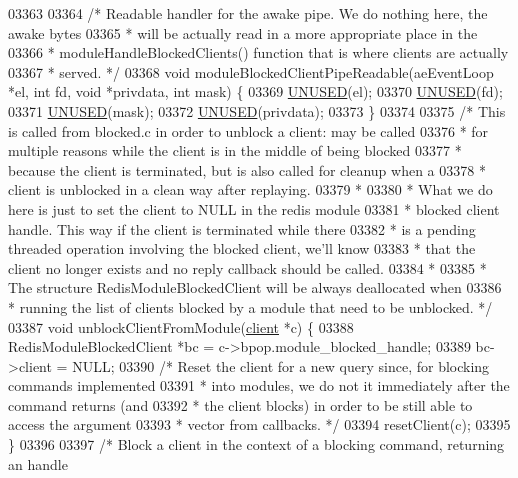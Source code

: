 \begin{DoxyCode}
{{{{{{{{{{03363 
03364 \textcolor{comment}{/* Readable handler for the awake pipe. We do nothing here, the awake bytes}
03365 \textcolor{comment}{ * will be actually read in a more appropriate place in the}
03366 \textcolor{comment}{ * moduleHandleBlockedClients() function that is where clients are actually}
03367 \textcolor{comment}{ * served. */}
03368 \textcolor{keywordtype}{void} moduleBlockedClientPipeReadable(aeEventLoop *el, \textcolor{keywordtype}{int} fd, \textcolor{keywordtype}{void} *privdata, \textcolor{keywordtype}{int} mask) \{
03369     \hyperlink{server_8h_ae7c9dc8f13568a9c856573751f1ee1ec}{UNUSED}(el);
03370     \hyperlink{server_8h_ae7c9dc8f13568a9c856573751f1ee1ec}{UNUSED}(fd);
03371     \hyperlink{server_8h_ae7c9dc8f13568a9c856573751f1ee1ec}{UNUSED}(mask);
03372     \hyperlink{server_8h_ae7c9dc8f13568a9c856573751f1ee1ec}{UNUSED}(privdata);
03373 \}
03374 
03375 \textcolor{comment}{/* This is called from blocked.c in order to unblock a client: may be called}
03376 \textcolor{comment}{ * for multiple reasons while the client is in the middle of being blocked}
03377 \textcolor{comment}{ * because the client is terminated, but is also called for cleanup when a}
03378 \textcolor{comment}{ * client is unblocked in a clean way after replaying.}
03379 \textcolor{comment}{ *}
03380 \textcolor{comment}{ * What we do here is just to set the client to NULL in the redis module}
03381 \textcolor{comment}{ * blocked client handle. This way if the client is terminated while there}
03382 \textcolor{comment}{ * is a pending threaded operation involving the blocked client, we'll know}
03383 \textcolor{comment}{ * that the client no longer exists and no reply callback should be called.}
03384 \textcolor{comment}{ *}
03385 \textcolor{comment}{ * The structure RedisModuleBlockedClient will be always deallocated when}
03386 \textcolor{comment}{ * running the list of clients blocked by a module that need to be unblocked. */}
03387 \textcolor{keywordtype}{void} unblockClientFromModule(\hyperlink{structclient}{client} *c) \{
03388     RedisModuleBlockedClient *bc = c->bpop.module\_blocked\_handle;
03389     bc->client = NULL;
03390     \textcolor{comment}{/* Reset the client for a new query since, for blocking commands implemented}
03391 \textcolor{comment}{     * into modules, we do not it immediately after the command returns (and}
03392 \textcolor{comment}{     * the client blocks) in order to be still able to access the argument}
03393 \textcolor{comment}{     * vector from callbacks. */}
03394     resetClient(c);
03395 \}
03396 
03397 \textcolor{comment}{/* Block a client in the context of a blocking command, returning an handle}
}}}}}}}}}}
\end{DoxyCode}

